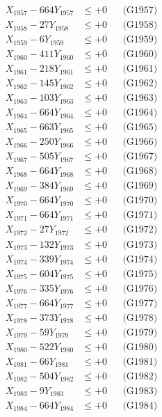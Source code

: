 \documentclass[a4paper,10pt]{article}
\begin{document}
{\begin{align}
X_{1957} - 664Y_{1957} &\leq +0 && \text{(G1957)} \\
X_{1958} - 27Y_{1958} &\leq +0 && \text{(G1958)} \\
X_{1959} - 6Y_{1959} &\leq +0 && \text{(G1959)} \\
X_{1960} - 411Y_{1960} &\leq +0 && \text{(G1960)} \\
\allowbreak
X_{1961} - 218Y_{1961} &\leq +0 && \text{(G1961)} \\
X_{1962} - 145Y_{1962} &\leq +0 && \text{(G1962)} \\
X_{1963} - 103Y_{1963} &\leq +0 && \text{(G1963)} \\
X_{1964} - 664Y_{1964} &\leq +0 && \text{(G1964)} \\
X_{1965} - 663Y_{1965} &\leq +0 && \text{(G1965)} \\
X_{1966} - 250Y_{1966} &\leq +0 && \text{(G1966)} \\
X_{1967} - 505Y_{1967} &\leq +0 && \text{(G1967)} \\
X_{1968} - 664Y_{1968} &\leq +0 && \text{(G1968)} \\
X_{1969} - 384Y_{1969} &\leq +0 && \text{(G1969)} \\
X_{1970} - 664Y_{1970} &\leq +0 && \text{(G1970)} \\
\allowbreak
X_{1971} - 664Y_{1971} &\leq +0 && \text{(G1971)} \\
X_{1972} - 27Y_{1972} &\leq +0 && \text{(G1972)} \\
X_{1973} - 132Y_{1973} &\leq +0 && \text{(G1973)} \\
X_{1974} - 339Y_{1974} &\leq +0 && \text{(G1974)} \\
X_{1975} - 604Y_{1975} &\leq +0 && \text{(G1975)} \\
X_{1976} - 335Y_{1976} &\leq +0 && \text{(G1976)} \\
X_{1977} - 664Y_{1977} &\leq +0 && \text{(G1977)} \\
X_{1978} - 373Y_{1978} &\leq +0 && \text{(G1978)} \\
X_{1979} - 59Y_{1979} &\leq +0 && \text{(G1979)} \\
X_{1980} - 522Y_{1980} &\leq +0 && \text{(G1980)} \\
\allowbreak
X_{1981} - 66Y_{1981} &\leq +0 && \text{(G1981)} \\
X_{1982} - 504Y_{1982} &\leq +0 && \text{(G1982)} \\
X_{1983} - 9Y_{1983} &\leq +0 && \text{(G1983)} \\
X_{1984} - 664Y_{1984} &\leq +0 && \text{(G1984)} \\

\end{align}}
\end{document}
